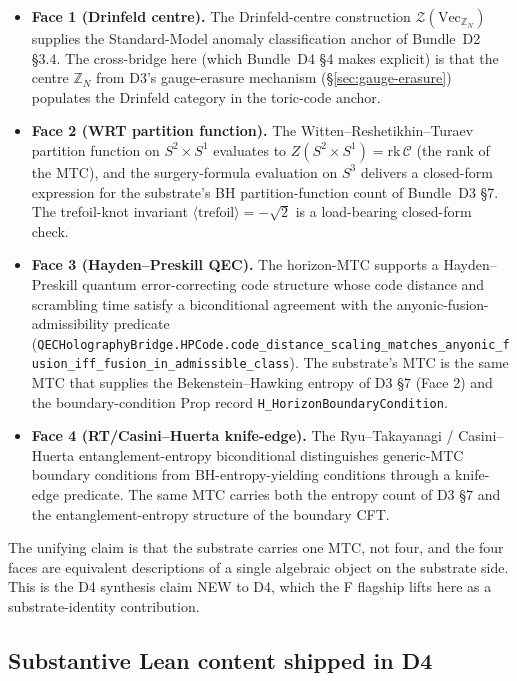 \documentclass[aps,prd,reprint,nofootinbib,superscriptaddress]{revtex4-2}
\begin{document}
\begin{itemize}
\item \textbf{Face 1 (Drinfeld centre).} The Drinfeld-centre
  construction $\mathcal{Z}(\mathrm{Vec}_{\mathbb{Z}_N})$ supplies the
  Standard-Model anomaly classification anchor of Bundle~D2 \S 3.4.
  The cross-bridge here (which Bundle~D4 \S 4 makes explicit) is
  that the centre $\mathbb{Z}_N$ from D3's gauge-erasure mechanism
  (\S\ref{sec:gauge-erasure}) populates the Drinfeld category in the
  toric-code anchor.
\item \textbf{Face 2 (WRT partition function).} The
  Witten--Reshetikhin--Turaev~\cite{ReshetikhinTuraev1991,Witten1989}
  partition function on $S^{2}\times S^{1}$ evaluates to
  $Z(S^{2}\times S^{1}) = \mathrm{rk}\,\mathcal{C}$ (the rank of the
  MTC), and the surgery-formula evaluation on $S^{3}$ delivers a
  closed-form expression for the substrate's BH partition-function
  count of Bundle~D3 \S 7. The trefoil-knot invariant
  $\langle\mathrm{trefoil}\rangle = -\sqrt{2}$ is a load-bearing
  closed-form check.
\item \textbf{Face 3 (Hayden--Preskill QEC).} The horizon-MTC supports
  a Hayden--Preskill quantum error-correcting code structure
  whose code distance and scrambling time satisfy a biconditional
  agreement with the anyonic-fusion-admissibility predicate
  (\texttt{QECHolographyBridge.HPCode.code\_distance\_scaling\_matches\_anyonic\_fusion\_iff\_fusion\_in\_admissible\_class}).
  The substrate's MTC is the same MTC that supplies the
  Bekenstein--Hawking entropy of D3 \S 7 (Face 2) and the boundary-condition
  Prop record \texttt{H\_HorizonBoundaryCondition}.
\item \textbf{Face 4 (RT/Casini--Huerta knife-edge).} The
  Ryu--Takayanagi / Casini--Huerta entanglement-entropy biconditional
  distinguishes generic-MTC boundary conditions from
  BH-entropy-yielding conditions through a knife-edge predicate.
  The same MTC carries both the entropy count of D3 \S 7 and the
  entanglement-entropy structure of the boundary CFT.
\end{itemize}

The unifying claim is that the substrate carries one MTC, not four,
and the four faces are equivalent descriptions of a single
algebraic object on the substrate side. This is the D4 synthesis
claim NEW to D4, which the F flagship lifts here as a substrate-identity
contribution.

\subsection{Substantive Lean content shipped in D4}
\end{document}
